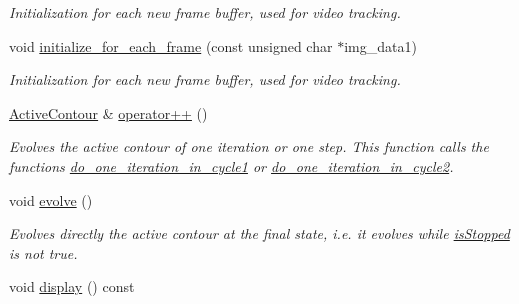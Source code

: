 \begin{DoxyCompactItemize}
\begin{DoxyCompactList}\small\item\em Initialization for each new frame buffer, used for video tracking. \end{DoxyCompactList}\item 
\hypertarget{classofeli_1_1_active_contour_abf6a4ff642511a4bb2437e11c0943b7e}{void \hyperlink{classofeli_1_1_active_contour_abf6a4ff642511a4bb2437e11c0943b7e}{initialize\-\_\-for\-\_\-each\-\_\-frame} (const unsigned char $\ast$img\-\_\-data1)}\label{classofeli_1_1_active_contour_abf6a4ff642511a4bb2437e11c0943b7e}

\begin{DoxyCompactList}\small\item\em Initialization for each new frame buffer, used for video tracking. \end{DoxyCompactList}\item 
\hypertarget{classofeli_1_1_active_contour_a23013e2eb528bc2fa4e108e928af6f8d}{\hyperlink{classofeli_1_1_active_contour}{Active\-Contour} \& \hyperlink{classofeli_1_1_active_contour_a23013e2eb528bc2fa4e108e928af6f8d}{operator++} ()}\label{classofeli_1_1_active_contour_a23013e2eb528bc2fa4e108e928af6f8d}

\begin{DoxyCompactList}\small\item\em Evolves the active contour of one iteration or one step. This function calls the functions \hyperlink{classofeli_1_1_active_contour_a2ab521c583572158549d416ccc755f3a}{do\-\_\-one\-\_\-iteration\-\_\-in\-\_\-cycle1} or \hyperlink{classofeli_1_1_active_contour_a7cf8243140d8ef8f72a638e9a1442dc2}{do\-\_\-one\-\_\-iteration\-\_\-in\-\_\-cycle2}. \end{DoxyCompactList}\item 
\hypertarget{classofeli_1_1_active_contour_a02cd4d93b90fee487e07f625f337aab1}{void \hyperlink{classofeli_1_1_active_contour_a02cd4d93b90fee487e07f625f337aab1}{evolve} ()}\label{classofeli_1_1_active_contour_a02cd4d93b90fee487e07f625f337aab1}

\begin{DoxyCompactList}\small\item\em Evolves directly the active contour at the final state, i.\-e. it evolves while \hyperlink{classofeli_1_1_active_contour_a610cd07a1013f1b50a5ec5a78c847a40}{is\-Stopped} is not {\ttfamily true}. \end{DoxyCompactList}\item 
\hypertarget{classofeli_1_1_active_contour_a0b5bbfea1f284dd6b94a3ca7883b1373}{void \hyperlink{classofeli_1_1_active_contour_a0b5bbfea1f284dd6b94a3ca7883b1373}{display} () const }\label{classofeli_1_1_active_contour_a0b5bbfea1f284dd6b94a3ca7883b1373}


\end{DoxyCompactItemize}
